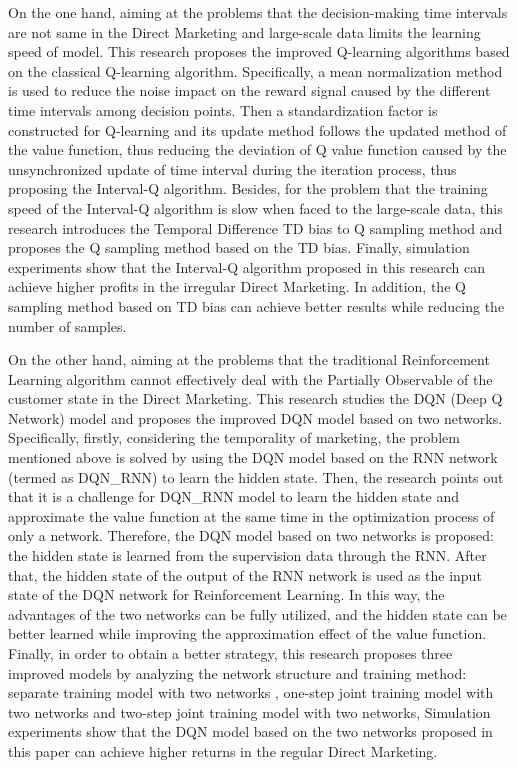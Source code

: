 \begin{enabstract}
On the one hand, aiming at the problems that the decision-making time intervals are not same in the Direct Marketing and large-scale data limits the learning speed of model. This research proposes the improved Q-learning algorithms based on the classical Q-learning algorithm. Specifically, a mean normalization method is used to reduce the noise impact on the reward signal caused by the different time intervals among decision points. Then a standardization factor is constructed for Q-learning and its update method follows the updated method of the value function, thus reducing the deviation of Q value function caused by the unsynchronized update of time interval during the iteration process, thus proposing the Interval-Q algorithm. Besides, for the problem that the training speed of the Interval-Q algorithm is slow when faced to the large-scale data, this research introduces the Temporal Difference TD bias to Q sampling method and proposes the Q sampling method based on the TD bias. Finally, simulation experiments show that the Interval-Q algorithm proposed in this research can achieve higher profits in the irregular Direct Marketing. In addition, the Q sampling method based on TD bias can achieve better results while reducing the number of samples.

On the other hand, aiming at the problems that the traditional Reinforcement Learning algorithm cannot effectively deal with the Partially Observable of the customer state in the Direct Marketing. This research studies the DQN (Deep Q Network) model and proposes the improved DQN model based on two networks. Specifically, firstly, considering the temporality of marketing, the problem mentioned above is solved by using the DQN model based on the RNN network (termed as DQN_RNN) to learn the hidden state. Then, the research points out that it is a challenge for DQN_RNN model to learn the hidden state and approximate the value function at the same time in the optimization process of only a network. Therefore, the DQN model based on two networks is proposed: the hidden state is learned from the supervision data through the RNN. After that, the hidden state of the output of the RNN network is used as the input state of the DQN network for Reinforcement Learning. In this way, the advantages of the two networks can be fully utilized, and the hidden state can be better learned while improving the approximation effect of the value function. Finally, in order to obtain a better strategy, this research proposes three improved models by analyzing the network structure and training method: separate training model with two networks , one-step joint training model with two networks and two-step joint training model with two networks, Simulation experiments show that the DQN model based on the two networks proposed in this paper can achieve higher returns in the regular Direct Marketing.


\end{enabstract}